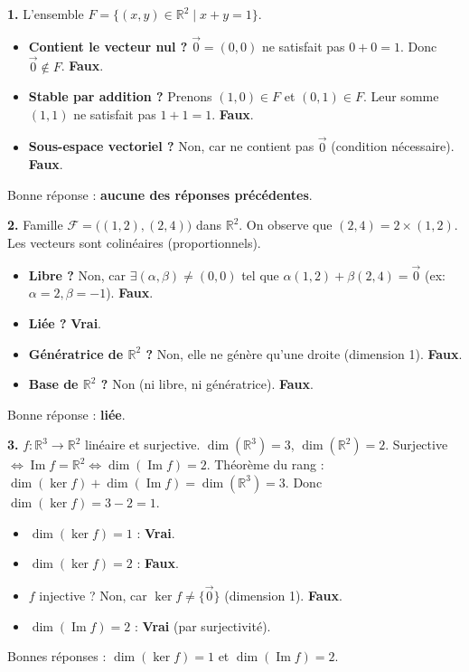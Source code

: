 \documentclass[11pt]{article}
\newcommand{\cle}[1]{{\popxbold\color{popdark}#1}}
\begin{document}
\begin{corrige}
\textbf{1.} L'ensemble $F=\{(x,y)\in\mathbb{R}^2 \mid x+y=1\}$.
\begin{itemize}
    \item \textbf{Contient le vecteur nul ?} $\vec{0}=(0,0)$ ne satisfait pas $0+0=1$. Donc $\vec{0}\notin F$. \textbf{Faux}.
    \item \textbf{Stable par addition ?} Prenons $(1,0)\in F$ et $(0,1)\in F$. Leur somme $(1,1)$ ne satisfait pas $1+1=1$. \textbf{Faux}.
    \item \textbf{Sous-espace vectoriel ?} Non, car ne contient pas $\vec{0}$ (condition nécessaire). \textbf{Faux}.
\end{itemize}
\cle{Bonne réponse :} \textbf{aucune des réponses précédentes}.

\textbf{2.} Famille $\mathcal{F}=\big((1,2),(2,4)\big)$ dans $\mathbb{R}^2$.
On observe que $(2,4)=2\times(1,2)$. Les vecteurs sont \cle{colinéaires} (proportionnels).
\begin{itemize}
    \item \textbf{Libre ?} Non, car $\exists (\alpha,\beta)\neq(0,0)$ tel que $\alpha(1,2)+\beta(2,4)=\vec{0}$ (ex: $\alpha=2,\beta=-1$). \textbf{Faux}.
    \item \textbf{Liée ?} \textbf{Vrai}.
    \item \textbf{Génératrice de $\mathbb{R}^2$ ?} Non, elle ne génère qu'une droite (dimension 1). \textbf{Faux}.
    \item \textbf{Base de $\mathbb{R}^2$ ?} Non (ni libre, ni génératrice). \textbf{Faux}.
\end{itemize}
\cle{Bonne réponse :} \textbf{liée}.

\textbf{3.} $f:\mathbb{R}^3\to\mathbb{R}^2$ linéaire et surjective.
$\dim(\mathbb{R}^3)=3$, $\dim(\mathbb{R}^2)=2$. Surjective $\iff \operatorname{Im} f = \mathbb{R}^2 \iff \dim(\operatorname{Im} f)=2$.
\cle{Théorème du rang} : $\dim(\ker f) + \dim(\operatorname{Im} f) = \dim(\mathbb{R}^3) = 3$.
Donc $\dim(\ker f) = 3 - 2 = 1$.
\begin{itemize}
    \item $\dim(\ker f)=1$ : \textbf{Vrai}.
    \item $\dim(\ker f)=2$ : \textbf{Faux}.
    \item $f$ injective ? Non, car $\ker f \neq \{\vec{0}\}$ (dimension 1). \textbf{Faux}.
    \item $\dim(\operatorname{Im} f)=2$ : \textbf{Vrai} (par surjectivité).
\end{itemize}
\cle{Bonnes réponses :} $\dim(\ker f)=1$ et $\dim(\operatorname{Im} f)=2$.


\end{corrige}
\end{document}
